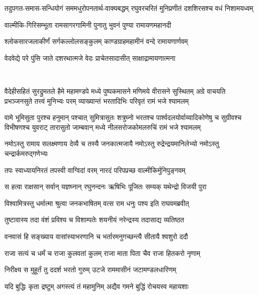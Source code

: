 \twolineshloka
{तदुपगत-समास-सन्धियोगं सममधुरोपनतार्थ-वाक्यबद्धम्}
{रघुवरचरितं मुनिप्रणीतं दशशिरसश्च वधं निशामयध्वम्}

\twolineshloka
{वाल्मीकि-गिरिसम्भूता रामसागरगामिनी}
{पुनातु भुवनं पुण्या रामायणमहानदी}

\twolineshloka
{श्लोकसारजलाकीर्णं सर्गकल्लोलसङ्कुलम्}
{काण्डग्राहमहामीनं वन्दे रामायणार्णवम्}

\twolineshloka
{वेदवेद्ये परे पुंसि जाते दशरथात्मजे}
{वेदः प्राचेतसादासीत् साक्षाद्रामायणात्मना}

\mbox{}\\
\resetShloka
{}

\fourlineindentedshloka
{वैदेहीसहितं सुरद्रुमतले हैमे महामण्डपे}
{मध्ये पुष्पकमासने मणिमये वीरासने सुस्थितम्}
{अग्रे वाचयति प्रभञ्जनसुते तत्त्वं मुनिभ्यः परम्}
{व्याख्यान्तं भरतादिभिः परिवृतं रामं भजे श्यामलम्}

\fourlineindentedshloka
{वामे भूमिसुता पुरश्च हनुमान् पश्चात् सुमित्रासुतः}
{शत्रुघ्नो भरतश्च पार्श्वदलयोर्वाय्वादिकोणेषु च}
{सुग्रीवश्च विभीषणश्च युवराट् तारासुतो जाम्बवान्}
{मध्ये नीलसरोजकोमलरुचिं रामं भजे श्यामलम्}

\twolineshloka
{नमोऽस्तु रामाय सलक्ष्मणाय देव्यै च तस्यै जनकात्मजायै}
{नमोऽस्तु रुद्रेन्द्रयमानिलेभ्यो नमोऽस्तु चन्द्रार्कमरुद्गणेभ्यः}

\clearpage
\resetShloka
{}
\twolineshloka
{तपः स्वाध्यायनिरतं तपस्वी वाग्विदां वरम्}
{नारदं परिपप्रच्छ वाल्मीकिर्मुनिपुङ्गवम्}%

\twolineshloka
{स हत्वा राक्षसान् सर्वान् यज्ञघ्नान् रघुनन्दनः}
{ऋषिभिः पूजितः सम्यक् यथेन्द्रो विजयी पुरा}%

\twolineshloka
{विश्वामित्रस्तु धर्मात्मा श्रुत्वा जनकभाषितम्}
{वत्स राम धनुः पश्य इति राघवमब्रवीत्}%

\twolineshloka
{तुष्टावास्य तदा वंशं  प्रविश्य च विशाम्पतेः}
{शयनीयं नरेन्द्रस्य तदासाद्य व्यतिष्ठत}%

\twolineshloka
{वनवासं हि सङ्ख्याय वासांस्याभरणानि च}
{भर्तारमनुगच्छन्त्यै सीतायै श्वशुरो ददौ}%

\twolineshloka
{राजा सत्यं च धर्मं च  राजा कुलवतां कुलम्}
{राजा माता पिता चैव राजा हितकरो नृणाम्}%

\twolineshloka
{निरीक्ष्य स मुहूर्तं तु ददर्श भरतो गुरुम्}
{उटजे राममासीनं जटामण्डलधारिणम्}%

\twolineshloka
{यदि बुद्धिः कृता द्रष्टुम् अगस्त्यं तं महामुनिम्}
{अद्यैव गमने बुद्धिं रोचयस्व महायशाः}%

